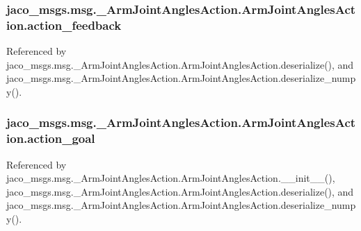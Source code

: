 \subsubsection[{\texorpdfstring{action\+\_\+feedback}{action_feedback}}]{\setlength{\rightskip}{0pt plus 5cm}jaco\+\_\+msgs.\+msg.\+\_\+\+Arm\+Joint\+Angles\+Action.\+Arm\+Joint\+Angles\+Action.\+action\+\_\+feedback}\hypertarget{classjaco__msgs_1_1msg_1_1__ArmJointAnglesAction_1_1ArmJointAnglesAction_a1d46fe85cd4ccda32ecdf75ac8f172aa}{}\label{classjaco__msgs_1_1msg_1_1__ArmJointAnglesAction_1_1ArmJointAnglesAction_a1d46fe85cd4ccda32ecdf75ac8f172aa}


Referenced by jaco\+\_\+msgs.\+msg.\+\_\+\+Arm\+Joint\+Angles\+Action.\+Arm\+Joint\+Angles\+Action.\+deserialize(), and jaco\+\_\+msgs.\+msg.\+\_\+\+Arm\+Joint\+Angles\+Action.\+Arm\+Joint\+Angles\+Action.\+deserialize\+\_\+numpy().

\subsubsection[{\texorpdfstring{action\+\_\+goal}{action_goal}}]{\setlength{\rightskip}{0pt plus 5cm}jaco\+\_\+msgs.\+msg.\+\_\+\+Arm\+Joint\+Angles\+Action.\+Arm\+Joint\+Angles\+Action.\+action\+\_\+goal}\hypertarget{classjaco__msgs_1_1msg_1_1__ArmJointAnglesAction_1_1ArmJointAnglesAction_a1228b85cf05f4f9a13183afd184c00ac}{}\label{classjaco__msgs_1_1msg_1_1__ArmJointAnglesAction_1_1ArmJointAnglesAction_a1228b85cf05f4f9a13183afd184c00ac}


Referenced by jaco\+\_\+msgs.\+msg.\+\_\+\+Arm\+Joint\+Angles\+Action.\+Arm\+Joint\+Angles\+Action.\+\_\+\+\_\+init\+\_\+\+\_\+(), jaco\+\_\+msgs.\+msg.\+\_\+\+Arm\+Joint\+Angles\+Action.\+Arm\+Joint\+Angles\+Action.\+deserialize(), and jaco\+\_\+msgs.\+msg.\+\_\+\+Arm\+Joint\+Angles\+Action.\+Arm\+Joint\+Angles\+Action.\+deserialize\+\_\+numpy().

